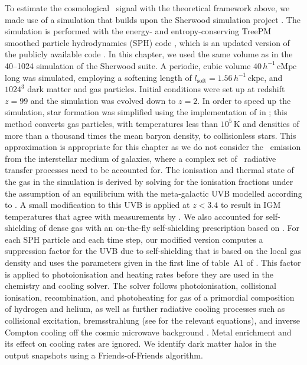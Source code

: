 To estimate the cosmological \lya\ signal with the theoretical framework above, we made use of a simulation that builds upon the Sherwood simulation project \citep{2017MNRAS.464..897B}. The simulation is performed with the energy- and entropy-conserving TreePM smoothed particle hydrodynamics (SPH) code , which is an updated version of the publicly available  code \citep{2001NewA....6...79S, 2005MNRAS.364.1105S}. In this chapter, we used the same volume as in the 40--1024 simulation of the Sherwood suite. A periodic, cubic volume $40 \, h^{-1} \, \mathrm{cMpc}$ long was simulated, employing a softening length of $l_\mathrm{soft}=1.56 \, h^{-1} \, \mathrm{ckpc}$, and $1024^3$ dark matter and gas particles. Initial conditions were set up at redshift $z=99$ and the simulation was evolved down to $z=2$. In order to speed up the simulation, star formation was simplified using the implementation of \citet{2004MNRAS.354..684V} in ; this method converts gas particles, with temperatures less than $10^5 \, \mathrm{K}$ and densities of more than a thousand times the mean baryon density, to collisionless stars. This approximation is appropriate for this chapter as we do not consider the \lya\ emission from the interstellar medium of galaxies, where a complex set of \lya\ radiative transfer processes need to be accounted for. The ionisation and thermal state of the gas in the simulation is derived by solving for the ionisation fractions under the assumption of an equilibrium with the meta-galactic UVB modelled according to . A small modification to this UVB is applied at $z<3.4$ \citep[see][]{2017MNRAS.464..897B} to result in IGM temperatures that agree with measurements by \citet{2011MNRAS.410.1096B}. We also accounted for self-shielding of dense gas with an on-the-fly self-shielding prescription based on \citet{2013MNRAS.430.2427R}. For each SPH particle and each time step, our modified  version computes a suppression factor for the UVB due to self-shielding that is based on the local gas density and uses the parameters given in the first line of table~A1 of \citet{2013MNRAS.430.2427R}. This factor is applied to photoionisation and heating rates before they are used in the chemistry and cooling solver. The solver follows photoionisation, collisional ionisation, recombination, and photoheating for gas of a primordial composition of hydrogen and helium, as well as further radiative cooling processes such as collisional excitation, bremsstrahlung (see \citealt{1996ApJS..105...19K} for the relevant equations), and inverse Compton cooling off the cosmic microwave background \citep{1986ApJ...301..522I}. Metal enrichment and its effect on cooling rates are ignored. We identify dark matter halos in the output snapshots using a Friends-of-Friends algorithm.

